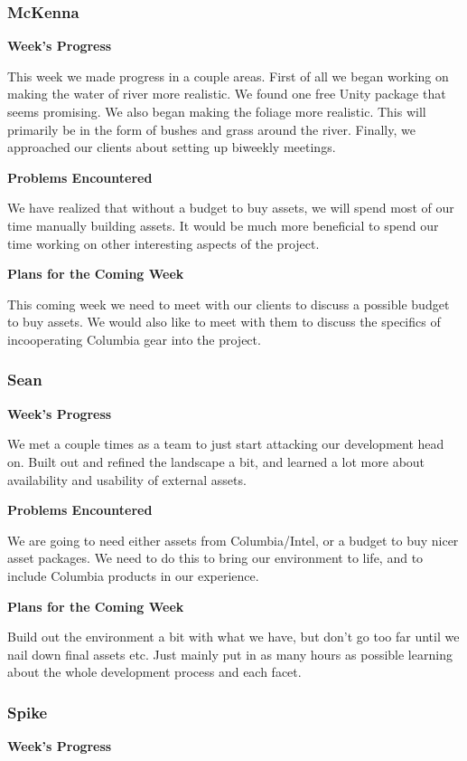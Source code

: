 \documentclass[10pt,journal,compsoc,onecolumn, draftclsnofoot]{IEEEtran}
\begin{document}
\subsubsection{McKenna}
\noindent \textbf{Week's Progress}

This week we made progress in a couple areas. First of all we began working on making the water of river more realistic. We found one free Unity package that seems promising. We also began making the foliage more realistic. This will primarily be in the form of bushes and grass around the river. Finally, we approached our clients about setting up biweekly meetings.

\noindent \textbf{Problems Encountered}

We have realized that without a budget to buy assets, we will spend most of our time manually building assets. It would be much more beneficial to spend our time working on other interesting aspects of the project.

\noindent \textbf{Plans for the Coming Week}

This coming week we need to meet with our clients to discuss a possible budget to buy assets. We would also like to meet with them to discuss the specifics of incooperating Columbia gear into the project.

\subsubsection{Sean}
\noindent \textbf{Week's Progress}

We met a couple times as a team to just start attacking our development head on. Built out and refined the landscape a bit, and learned a lot more about availability and usability of external assets.

\noindent \textbf{Problems Encountered}

We are going to need either assets from Columbia/Intel, or a budget to buy nicer asset packages.  We need to do this to bring our environment to life, and to include Columbia products in our experience.

\noindent \textbf{Plans for the Coming Week}

Build out the environment a bit with what we have, but don't go too far until we nail down final assets etc. Just mainly put in as many hours as possible learning about the whole development process and each facet.

\subsubsection{Spike}
\noindent \textbf{Week's Progress}
\end{document}
